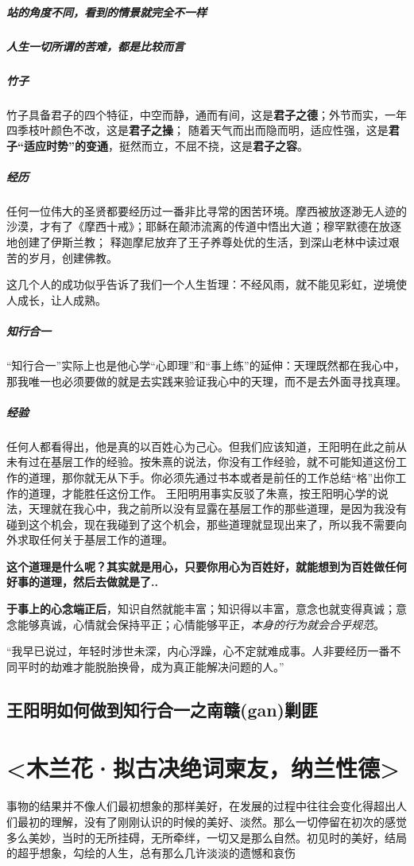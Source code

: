 \documentclass[UTF8,a4paper,8pt]{ctexbook}
\begin{document}
				\subparagraph{站的角度不同，看到的情景就完全不一样}
				\subparagraph{人生一切所谓的苦难，都是比较而言}
				
				\subparagraph{竹子}
					竹子具备君子的四个特征，中空而静，通而有间，这是\textbf{君子之德}；外节而实，一年四季枝叶颜色不改，这是\textbf{君子之操}； 随着天气而出而隐而明，适应性强，这是\textbf{君子“适应时势”的变通}，挺然而立，不屈不挠，这是\textbf{君子之容}。
					
				\subparagraph{经历}
					任何一位伟大的圣贤都要经历过一番非比寻常的困苦环境。摩西被放逐渺无人迹的沙漠，才有了《摩西十戒》；耶稣在颠沛流离的传道中悟出大道；穆罕默德在放逐地创建了伊斯兰教； 释迦摩尼放弃了王子养尊处优的生活，到深山老林中读过艰苦的岁月，创建佛教。
					
					这几个人的成功似乎告诉了我们一个人生哲理：不经风雨，就不能见彩虹，逆境使人成长，让人成熟。
					
				\subparagraph{知行合一}
					“知行合一”实际上也是他心学“心即理”和“事上练”的延伸：天理既然都在我心中，那我唯一也必须要做的就是去实践来验证我心中的天理，而不是去外面寻找真理。
					
				\subparagraph{经验}
					任何人都看得出，他是真的以百姓心为己心。但我们应该知道，王阳明在此之前从未有过在基层工作的经验。按朱熹的说法，你没有工作经验，就不可能知道这份工作的道理，那你就无从下手。你必须先通过书本或者是前任的工作总结“格”出你工作的道理，才能胜任这份工作。 王阳明用事实反驳了朱熹，按王阳明心学的说法，天理就在我心中，我之前所以没有显露在基层工作的那些道理，是因为我没有碰到这个机会，现在我碰到了这个机会，那些道理就显现出来了，所以我不需要向外求取任何关于基层工作的道理。
					
					\textbf{这个道理是什么呢？其实就是用心，只要你用心为百姓好，就能想到为百姓做任何好事的道理，然后去做就是了..}
					
					\textbf{于事上的心念端正后}，知识自然就能丰富；知识得以丰富，意念也就变得真诚；意念能够真诚，心情就会保持平正；心情能够平正，\textit{本身的行为就会合乎规范}。
					
					“我早已说过，年轻时涉世未深，内心浮躁，心不定就难成事。人非要经历一番不同平时的劫难才能脱胎换骨，成为真正能解决问题的人。”
					
		 \subsection{王阳明如何做到知行合一之南赣(gan)剿匪}
		 \newpage
	 \section{<木兰花·拟古决绝词柬友，纳兰性德>}	
		 事物的结果并不像人们最初想象的那样美好，在发展的过程中往往会变化得超出人们最初的理解，没有了刚刚认识的时候的美好、淡然。那么一切停留在初次的感觉多么美妙，当时的无所挂碍，无所牵绊，一切又是那么自然。初见时的美好，结局的超乎想象，勾绘的人生，总有那么几许淡淡的遗憾和哀伤
		 
\end{document}
